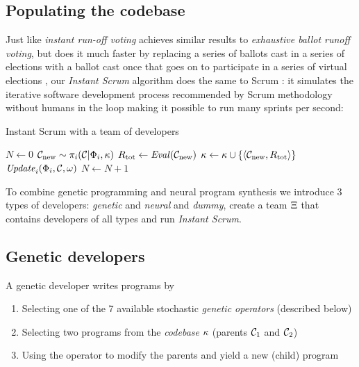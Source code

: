 \newpage \subsection{Populating the codebase}

Just like \emph{instant run-off voting} achieves similar results to \emph{exhaustive ballot runoff voting}, but does it much faster by replacing a series of ballots cast in a series of elections with a ballot cast once that goes on to participate in a series of virtual elections \cite{votingsystems}, our \emph{Instant Scrum} algorithm does the same to Scrum \cite{scrum}: it simulates the iterative software development process recommended by Scrum methodology without humans in the loop making it possible to run many sprints per second:

\begin{algorithm}[H]
\begin{algorithmic}[1]
\caption{Instant Scrum with a team of developers}
\label{alg:instantscrum}
\State $N \gets 0$
\State $\mathcal{C}_\text{new}\sim \pi_i(\mathcal{C} | \Phi_i, \kappa)$ 
\State $R_\text{tot} \gets \mathit{Eval}(\mathcal{C}_\text{new})$
\State $\kappa \gets \kappa \cup \{\langle \mathcal{C}_\text{new}, R_\text{tot} \rangle\}$
\State $\mathit{Update}_i(\Phi_i, \mathcal{C}, \omega)$
\State $N \gets N+1$
\EndFor
\EndWhile
\EndProcedure
\end{algorithmic}
\end{algorithm}

To combine genetic programming and neural program synthesis we introduce 3 types of developers: \emph{genetic} and \emph{neural} and \emph{dummy}, create a team $\Xi$ that contains developers of all types and run \emph{Instant Scrum}.

\newpage \subsection{Genetic developers}
\label{sec:genetic}

A genetic developer writes programs by
\begin{enumerate}
    \item Selecting one of the 7 available stochastic \emph{genetic operators} (described below)
    \item Selecting two programs from the \emph{codebase} $\kappa$ (parents $\mathcal{C}_1$ and $\mathcal{C}_2$) 
    \item Using the operator to modify the parents and yield a new (child) program
\end{enumerate}

